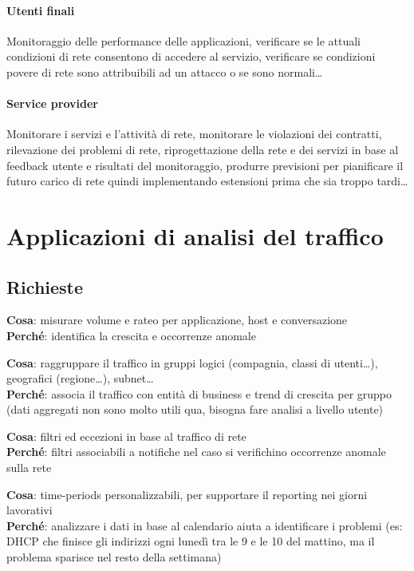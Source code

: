 \documentclass[10pt]{book}
\begin{document}
\paragraph{Utenti finali} Monitoraggio delle performance delle applicazioni, verificare se le attuali condizioni di rete consentono di accedere al servizio, verificare se condizioni povere di rete sono attribuibili ad un attacco o se sono normali\ldots
\paragraph{Service provider} Monitorare i servizi e l'attività di rete, monitorare le violazioni dei contratti, rilevazione dei problemi di rete, riprogettazione della rete e dei servizi in base al feedback utente e risultati del monitoraggio, produrre previsioni per pianificare il futuro carico di rete quindi implementando estensioni prima che sia troppo tardi\ldots
\section{Applicazioni di analisi del traffico}
\subsection{Richieste}
\begin{list}{}{}
	\item \textbf{Cosa}: misurare volume e rateo per applicazione, host e conversazione\\
	\textbf{Perché}: identifica la crescita e occorrenze anomale
	\item \textbf{Cosa}: raggruppare il traffico in gruppi logici (compagnia, classi di utenti\ldots), geografici (regione\ldots), subnet\ldots\\
	\textbf{Perché}: associa il traffico con entità di business e trend di crescita per gruppo (dati aggregati non sono molto utili qua, bisogna fare analisi a livello utente)
	\item \textbf{Cosa}: filtri ed eccezioni in base al traffico di rete\\
	\textbf{Perché}: filtri associabili a notifiche nel caso si verifichino occorrenze anomale sulla rete
	\item \textbf{Cosa}: time-periods personalizzabili, per supportare il reporting nei giorni lavorativi\\
	\textbf{Perché}: analizzare i dati in base al calendario aiuta a identificare i problemi (es: DHCP che finisce gli indirizzi ogni lunedì tra le 9 e le 10 del mattino, ma il problema sparisce nel resto della settimana)
\end{list}
\end{document}
